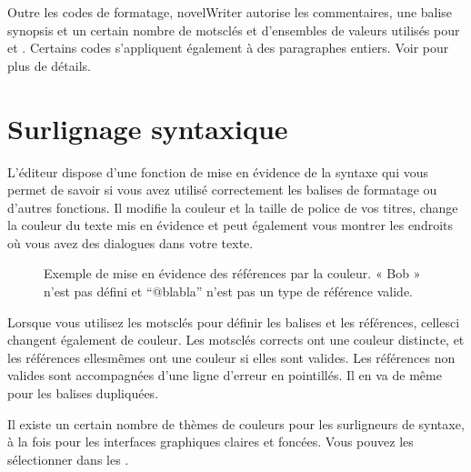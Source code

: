 \documentclass[a4paper,11pt,french]{sphinxmanual}
\begin{document}
\sphinxAtStartPar
Outre les codes de formatage, novelWriter autorise les commentaires, une balise synopsis et un certain nombre de mots\sphinxhyphen{}clés et d’ensembles de valeurs utilisés pour {\hyperref[\detokenize{int_glossary:term-Tag}]{}} et {\hyperref[\detokenize{int_glossary:term-Reference}]{}}. Certains codes s’appliquent également à des paragraphes entiers. Voir {\hyperref[\detokenize{usage_format:a-fmt-text}]{}} pour plus de détails.


\section{Surlignage syntaxique}
\label{\detokenize{usage_format:syntax-highlighting}}\label{\detokenize{usage_format:a-fmt-hlight}}
\sphinxAtStartPar
L’éditeur dispose d’une fonction de mise en évidence de la syntaxe qui vous permet de savoir si vous avez utilisé correctement les balises de formatage ou d’autres fonctions. Il modifie la couleur et la taille de police de vos titres, change la couleur du texte mis en évidence et peut également vous montrer les endroits où vous avez des dialogues dans votre texte.

\begin{figure}[htbp]
\centering
\capstart

\noindent{}
\caption{Exemple de mise en évidence des références par la couleur. « Bob » n’est pas défini et “@blabla” n’est pas un type de référence valide.}\label{\detokenize{usage_format:id1}}\end{figure}

\sphinxAtStartPar
Lorsque vous utilisez les mots\sphinxhyphen{}clés pour définir les balises et les références, celles\sphinxhyphen{}ci changent également de couleur. Les mots\sphinxhyphen{}clés corrects ont une couleur distincte, et les références elles\sphinxhyphen{}mêmes ont une couleur si elles sont valides. Les références non valides sont accompagnées d’une ligne d’erreur en pointillés. Il en va de même pour les balises dupliquées.

\sphinxAtStartPar
Il existe un certain nombre de thèmes de couleurs pour les surligneurs de syntaxe, à la fois pour les interfaces graphiques claires et foncées. Vous pouvez les sélectionner dans les .
\end{document}
